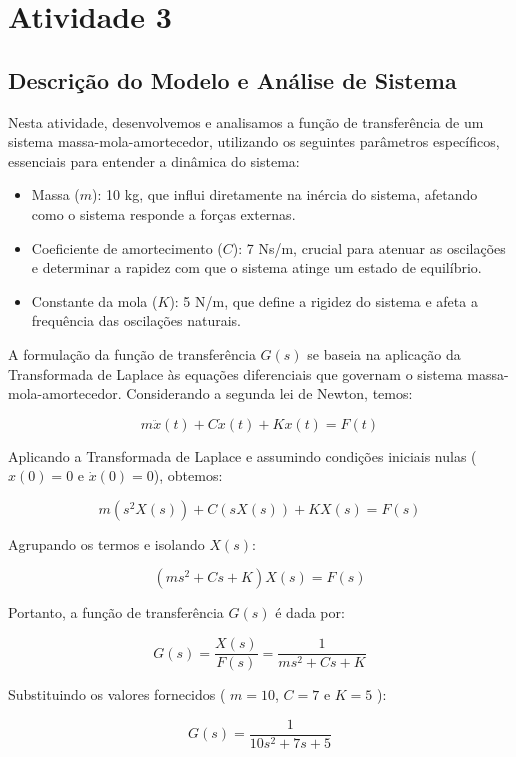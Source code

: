 \section{Atividade 3}

\subsection{Descrição do Modelo e Análise de Sistema}
Nesta atividade, desenvolvemos e analisamos a função de transferência de um sistema massa-mola-amortecedor, utilizando os seguintes parâmetros específicos, essenciais para entender a dinâmica do sistema:
\begin{itemize}
    \item Massa (\( m \)): 10 kg, que influi diretamente na inércia do sistema, afetando como o sistema responde a forças externas.
    \item Coeficiente de amortecimento (\( C \)): 7 Ns/m, crucial para atenuar as oscilações e determinar a rapidez com que o sistema atinge um estado de equilíbrio.
    \item Constante da mola (\( K \)): 5 N/m, que define a rigidez do sistema e afeta a frequência das oscilações naturais.
\end{itemize}

A formulação da função de transferência \( G(s) \) se baseia na aplicação da Transformada de Laplace às equações diferenciais que governam o sistema massa-mola-amortecedor. Considerando a segunda lei de Newton, temos:

\[
m\ddot{x}(t) + C\dot{x}(t) + Kx(t) = F(t)
\]

Aplicando a Transformada de Laplace e assumindo condições iniciais nulas (\( x(0) = 0 \) e \( \dot{x}(0) = 0 \)), obtemos:

\[
m(s^2X(s)) + C(sX(s)) + KX(s) = F(s)
\]

Agrupando os termos e isolando \( X(s) \):

\[
(m s^2 + Cs + K)X(s) = F(s)
\]

Portanto, a função de transferência \( G(s) \) é dada por:

\[
G(s) = \frac{X(s)}{F(s)} = \frac{1}{m s^2 + Cs + K}
\]

Substituindo os valores fornecidos ( \( m = 10 \), \( C = 7 \) e \( K = 5 \) ):

\[
G(s) = \frac{1}{10s^2 + 7s + 5}
\]

